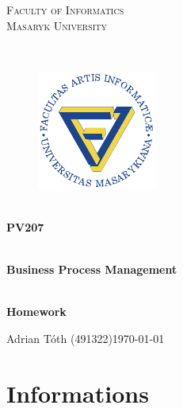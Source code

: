 \documentclass[11pt,a4paper]{article}
\begin{document}
\begin{titlepage}

    \begin{center}
        \vfill {%
            \Huge{%
                \textsc{%
                    Faculty of Informatics\\[3mm]%
                    Masaryk University%
                }%
            }%
        }%

        \hfill\\[15mm]

        \begin{figure}[!h]
            \centering
            \includegraphics[scale=3]{muni-fi-logo.pdf}
        \end{figure}

        \hfill\\[10mm]

        \Huge{
            \textbf{
                PV207
            }
        }

        \hfill\\[-10mm]

        \huge{
            \textbf{
                Business Process Management
            }
        }

        \hfill\\[10mm]

        \LARGE{
            \textbf{
                Homework
            }
        }
        \vfill

    \end{center}

        \Large{
            \noindent Adrian Tóth (491322)\hfill \today
        }

\end{titlepage}

\setlength{\parskip}{0pt}
    {
        \hypersetup{
            hidelinks=true
        }
        \tableofcontents
    }
\setlength{\parskip}{0pt}

\newpage

\section{Informations}
\end{document}
